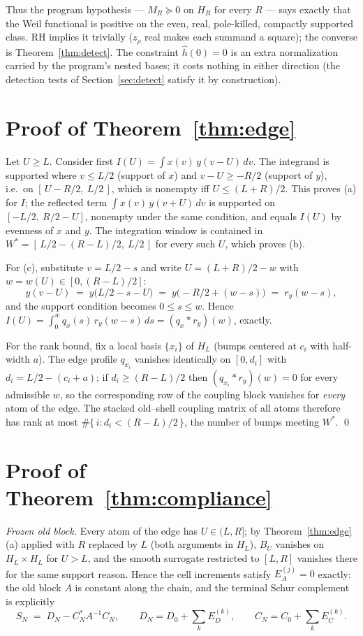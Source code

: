 \documentclass[11pt,reqno]{amsart}
\theoremstyle{plain}
\theoremstyle{definition}
\theoremstyle{remark}
\begin{document}
Thus the program hypothesis --- $M_R \succeq 0$ on $H_R$ for every $R$ --- says exactly that
the Weil functional is positive on the even, real, pole-killed, compactly supported class.
RH implies it trivially ($z_\rho$ real makes each summand a square); the converse is
Theorem~\ref{thm:detect}. The constraint $\hat h(0) = 0$ is an extra normalization carried by
the program's nested bases; it costs nothing in either direction (the detection tests of
Section~\ref{sec:detect} satisfy it by construction).

\section{Proof of Theorem~\ref{thm:edge}}

Let $U \ge L$. Consider first $I(U) = \int x(v)\,y(v-U)\,dv$. The integrand is supported
where $v \le L/2$ (support of $x$) and $v - U \ge -R/2$ (support of $y$), i.e.\ on
$[\,U - R/2,\ L/2\,]$, which is nonempty iff $U \le (L+R)/2$. This proves (a) for $I$; the
reflected term $\int x(v)\,y(v+U)\,dv$ is supported on $[-L/2,\ R/2 - U]$, nonempty under the
same condition, and equals $I(U)$ by evenness of $x$ and $y$. The integration window is
contained in $W^* = [\,L/2 - (R-L)/2,\ L/2\,]$ for every such $U$, which proves (b).

For (c), substitute $v = L/2 - s$ and write $U = (L+R)/2 - w$ with $w = w(U) \in [0,(R-L)/2]$:
\[
y(v - U) \;=\; y\!\big(L/2 - s - U\big) \;=\; y\!\big(-R/2 + (w - s)\big) \;=\; r_y(w - s),
\]
and the support condition becomes $0 \le s \le w$. Hence
$I(U) = \int_0^{w} q_x(s)\, r_y(w-s)\, ds = (q_x * r_y)(w)$, exactly.

For the rank bound, fix a local basis $\{x_i\}$ of $H_L$ (bumps centered at $c_i$ with
half-width $a$). The edge profile $q_{x_i}$ vanishes identically on $[0, d_i]$ with
$d_i = L/2 - (c_i + a)$; if $d_i \ge (R-L)/2$ then $(q_{x_i} * r_y)(w) = 0$ for every
admissible $w$, so the corresponding row of the coupling block vanishes for \emph{every} atom
of the edge. The stacked old--shell coupling matrix of all atoms therefore has rank at most
$\#\{\,i : d_i < (R-L)/2\,\}$, the number of bumps meeting $W^*$. \qed

\section{Proof of Theorem~\ref{thm:compliance}}

\emph{Frozen old block.} Every atom of the edge has $U \in (L, R]$; by Theorem~\ref{thm:edge}(a)
applied with $R$ replaced by $L$ (both arguments in $H_L$), $B_U$ vanishes on
$H_L \times H_L$ for $U > L$, and the smooth surrogate restricted to $[L,R]$ vanishes there
for the same support reason. Hence the cell increments satisfy $E_A^{(j)} = 0$ exactly: the
old block $A$ is constant along the chain, and the terminal Schur complement is explicitly
\[
S_N \;=\; D_N - C_N^* A^{-1} C_N, \qquad
D_N = D_0 + \textstyle\sum_k E_D^{(k)}, \qquad
C_N = C_0 + \textstyle\sum_k E_C^{(k)} .
\]
\end{document}
